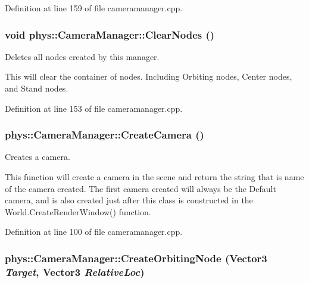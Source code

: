 Definition at line 159 of file cameramanager.cpp.

\hypertarget{classphys_1_1CameraManager_a42d91612bbaa00187944290d6bfd44e9}{
\subsubsection[{ClearNodes}]{\setlength{\rightskip}{0pt plus 5cm}void phys::CameraManager::ClearNodes ()}}
\label{d9/d91/classphys_1_1CameraManager_a42d91612bbaa00187944290d6bfd44e9}


Deletes all nodes created by this manager. 

This will clear the container of nodes. Including Orbiting nodes, Center nodes, and Stand nodes. 

Definition at line 153 of file cameramanager.cpp.

\hypertarget{classphys_1_1CameraManager_ac6ff80c91fa5a2cd21ebd8b78db9add2}{
\subsubsection[{CreateCamera}]{ phys::CameraManager::CreateCamera ()}}
\label{d9/d91/classphys_1_1CameraManager_ac6ff80c91fa5a2cd21ebd8b78db9add2}


Creates a camera. 

This function will create a camera in the scene and return the string that is name of the camera created. The first camera created will always be the Default camera, and is also created just after this class is constructed in the World.CreateRenderWindow() function. 

Definition at line 100 of file cameramanager.cpp.

\hypertarget{classphys_1_1CameraManager_a9a696ea09f174a69bbc6d0bb179b3de4}{
\subsubsection[{CreateOrbitingNode}]{ phys::CameraManager::CreateOrbitingNode ({\bf Vector3} {\em Target}, \/  {\bf Vector3} {\em RelativeLoc})}}
\label{d9/d91/classphys_1_1CameraManager_a9a696ea09f174a69bbc6d0bb179b3de4}


